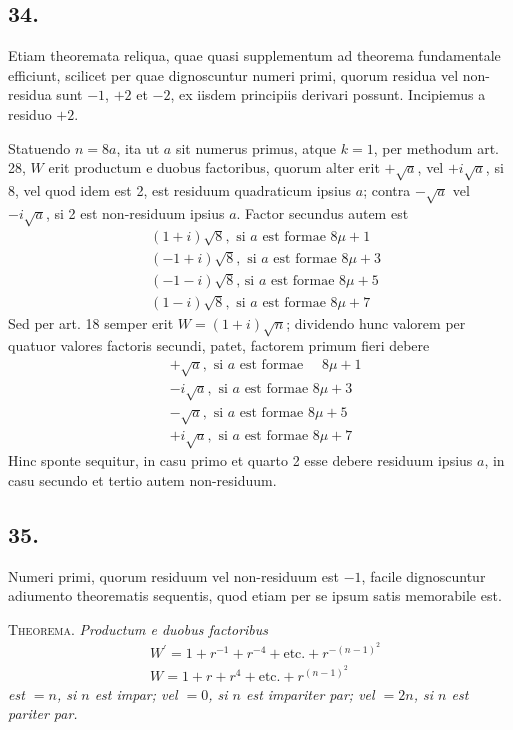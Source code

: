 \documentclass[twoside,12pt, showframe]{memoir}
\begin{document}
\subsection*{34.}
 
Etiam theoremata reliqua, quae quasi supplementum ad theorema fundamentale efficiunt, scilicet per quae dignoscuntur numeri primi, quorum residua vel non-residua sunt \(-1\), \(+2\) et \(-2\), ex iisdem principiis derivari possunt. Incipiemus a residuo \(+2\).

Statuendo \(n=8 a\), ita ut \(a\) sit numerus primus, atque \(k=1\), per methodum art. 28, \(W\) erit productum e duobus factoribus, quorum alter erit \(+\surd a\), vel \(+i \surd a\), si 8, vel quod idem est 2, est residuum quadraticum ipsius \(a\); contra \(-\surd a\) vel \(-i \surd a\), si 2 est non-residuum ipsius \(a\). Factor secundus autem est
\[\begin{aligned}
& (1+i) \surd 8, \text{ si } a \text{ est formae } 8 \mu+1 \\
& (-1+i) \surd 8, \text{ si } a \text{ est formae } 8 \mu+3 \\
& (-1-i) \surd 8 \text{, si } a \text{ est formae } 8 \mu+5 \\
& (1-i) \surd 8, \text{ si } a \text{ est formae } 8 \mu+7
\end{aligned}\]
Sed per art. 18 semper erit \(W=(1+i) \surd n\); dividendo hunc valorem per quatuor valores factoris secundi, patet, factorem primum fieri debere
\[\begin{aligned}
& +\surd a, \text{ si } a \text{ est formae } \quad 8 \mu+1 \\
& -i \surd a, \text{ si } a \text{ est formae } 8 \mu+3 \\
& -\surd a, \text{ si } a \text{ est formae } 8 \mu+5 \\
& +i \surd a, \text{ si } a \text{ est formae } 8 \mu+7
\end{aligned}\]
Hinc sponte sequitur, in casu primo et quarto 2 esse debere residuum ipsius \(a\), in casu secundo et tertio autem non-residuum.\clearpage\noindent%

\subsection*{35.}
 
Numeri primi, quorum residuum vel non-residuum est \(-1\), facile dignoscuntur adiumento theorematis sequentis, quod etiam per se ipsum satis memorabile est.
 
\textsc{Theorema.} \textit{Productum e duobus factoribus}
\[\begin{aligned}
& W^{\prime}=1+r^{-1}+r^{-4}+\text{etc.}+r^{-(n-1)^{2}} \\
& W=1+r+r^{4}+\text{etc.}+r^{(n-1)^{2}}
\end{aligned}\]
\textit{est \(=n\), si \(n\) est impar; vel \(=0\), si \(n\) est impariter par; vel \(=2 n\), si \(n\) est pariter par.}
 
\end{document}
